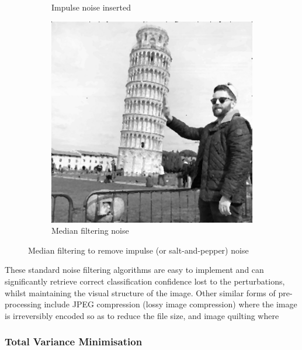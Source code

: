 \begin{figure}[h!]
\begin{subfigure}{.3\textwidth}
		\caption{Impulse noise inserted}
		\label{fig: LAPLAR2}
	\end{subfigure}
	\begin{subfigure}{.3\textwidth}
		\includegraphics[width=\textwidth]{Ifiltered.png}
		\caption{Median filtering noise}
		\label{fig: LAPLAR3}
	\end{subfigure}
	\caption{Median filtering to remove impulse (or salt-and-pepper) noise}
\end{figure}
These standard noise filtering algorithms are easy to implement and can significantly retrieve correct classification confidence lost to the perturbations, whilst maintaining the visual structure of the image. Other similar forms of pre-processing include JPEG compression (lossy image compression) where the image is irreversibly encoded so as to reduce the file size, and image quilting where 



\subsubsection{Total Variance Minimisation}

